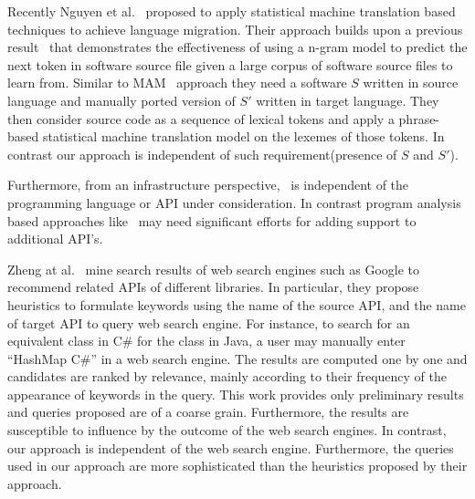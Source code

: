 Recently Nguyen et al.~\cite{nguyen2014migrating,nguyen2014statistical} proposed
to apply statistical machine translation based techniques to achieve language migration.
Their approach builds upon a previous result~\cite{hindle2012naturalness} that demonstrates the effectiveness of using
a n-gram model to predict the next token in software source file
given a large corpus of software source files to learn from.
Similar to MAM~\cite{Zhong2010ICSE} approach they
need a software $S$ written in source language and manually ported version of $S'$ written in target language. 
They then consider source code as a sequence of lexical tokens and
apply a phrase-based statistical machine translation model on the lexemes of those tokens.
In contrast our approach is independent of such requirement(presence of $S$ and $S'$).


Furthermore, from an infrastructure perspective, \tool\ is independent of the programming language or API under consideration. In contrast program analysis based approaches like~\cite{Zhong2010ICSE,Gokhale2013ICSE,nguyen2014statistical} may need significant
efforts for adding support to additional API's.

Zheng at al.~\cite{Zheng2011FSE} mine search results of web search engines
such as Google to recommend related APIs of different libraries. 
In particular, they propose heuristics to formulate keywords using the
name of the source API, and the name of target API to query web search engine.
For instance, to search for an equivalent class in C\# for the  class in Java,
a user may manually enter ``HashMap C\#'' in a web search engine.
The results are computed one by one and candidates are ranked by relevance,
mainly according to their frequency of the appearance of keywords in the query.
This work provides only preliminary results and queries proposed are of a coarse grain. 
Furthermore, the results are susceptible to influence by the outcome of the web search engines.
In contrast, our approach is independent of the web search engine. Furthermore, the queries used in our approach are more sophisticated than the heuristics proposed by their approach.





